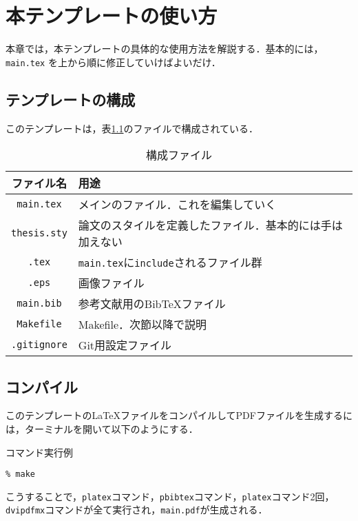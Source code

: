 \chapter{本テンプレートの使い方}
\label{chap:howto}

本章では，本テンプレートの具体的な使用方法を解説する．基本的には，{\tt main.tex} を上から順に修正していけばよいだけ． 


\section{テンプレートの構成}

このテンプレートは，表\ref{tb:files}のファイルで構成されている．

\begin{table}[htbp]
  \caption{構成ファイル}
  \label{tb:files}
  \begin{center}\begin{tabular}{c|l}
    \hline
    ファイル名&用途\\\hline\hline
    {\tt main.tex}&メインのファイル．これを編集していく\\\hline
    {\tt thesis.sty}&論文のスタイルを定義したファイル．基本的には手は加えない\\\hline
    {\tt *.tex}&{\tt main.tex}に{\tt include}されるファイル群\\\hline
    {\tt *.eps}&画像ファイル\\\hline
    {\tt main.bib}&参考文献用のBibTeXファイル\\\hline
    {\tt Makefile}&Makefile．次節以降で説明\\\hline
    {\tt .gitignore}&Git用設定ファイル\\\hline
  \end{tabular}\end{center}
\end{table}

\section{コンパイル}
このテンプレートの\LaTeX ファイルをコンパイルしてPDFファイルを生成するには，ターミナルを開いて以下のようにする．

\begin{itembox}[l]{コマンド実行例}
\begin{verbatim}
% make
\end{verbatim}
\end{itembox}

こうすることで，\verb|platex|コマンド，\verb|pbibtex|コマンド，\verb|platex|コマンド2回，\verb|dvipdfmx|コマンドが全て実行され，{\tt main.pdf}が生成される．

